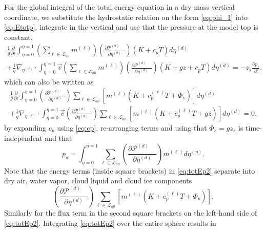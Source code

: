 \documentclass{agujournal}
\begin{document}
{For the global integral of the total energy equation in a dry-mass vertical coordinate, we substitute the hydrostatic relation on the form \eqref{eq:phi_1} into \eqref{eq:Etotp}, integrate in the vertical and use that the pressure at the model top is constant,
\begin{multline}
\frac{1}{g}\frac{\partial }{\partial t}\int_{\eta=0}^{\eta=1} \left( \sum_{\ell \in \mathcal{L}_{all}} m^{(\ell)}\right) \left( \frac{\partial \mathcal{P}^{(d)}\quad }{\partial \eta^{(d)}} \right)\left(K+c_pT\right)d \eta^{(d)}\\ +\frac{1}{g}\nabla_{\eta^{(d)}} \cdot \int_{\eta=0}^{\eta=1} \vec{v} \left( \sum_{\ell \in \mathcal{L}_{all}} m^{(\ell)}\right) \left( \frac{\partial \mathcal{P}^{(d)}\quad }{\partial \eta^{(d)}} \right)\left( K+gz+c_pT \right) d \eta^{(d)} =-z_s\frac{\partial p_s}{\partial t},\label{eq:tmp99}
\end{multline}
which can also be written as
\begin{multline}
\frac{1}{g}\frac{\partial }{\partial t}\int_{\eta=0}^{\eta=1} \left( \frac{\partial \mathcal{P}^{(d)}\quad }{\partial \eta^{(d)}} \right)\sum_{\ell \in \mathcal{L}_{all}} \left[m^{(\ell)} \left(K+c_p^{(\ell)}T+\Phi_s  \right)\right]d \eta^{(d)}\\ +\frac{1}{g}\nabla_{\eta^{(d)}} \cdot \int_{\eta=0}^{\eta=1} \vec{v} \left( \frac{\partial \mathcal{P}^{(d)}\quad }{\partial \eta^{(d)}} \right)\sum_{\ell \in \mathcal{L}_{all}} \left[ m^{(\ell)}\left(K+c_p^{(\ell)}T+gz\right) \right]d \eta^{(d)} =0.\label{eq:totEp2}
\end{multline}
by expanding $c_p$ using \eqref{eq:cp}, re-arranging terms and using that $\Phi_s=gz_s$ is time-independent and that 
\begin{equation}
p_s=\int_{\eta=0}^{\eta=1}\sum_{\ell \in \mathcal{L}_{all}}  \left( \frac{\partial \mathcal{P}^{(d)}\quad }{\partial \eta^{(d)}}\right) m^{(\ell)}d\eta^{(\eta)}.
\end{equation}
Note that the energy terms (inside square brackets) in \eqref{eq:totEp2} separate into dry air, water vapor, cloud liquid and cloud ice components
\begin{equation}
\left( \frac{\partial \mathcal{P}^{(d)}\quad }{\partial \eta^{(d)}} \right)\sum_{\ell \in \mathcal{L}_{all}} \left[ m^{(\ell)}\left(K+c_p^{(\ell)}T+\Phi_s\right)\right].
\end{equation}
Similarly for the flux term in the second square brackets on the left-hand side of \eqref{eq:totEp2}. Integrating \eqref{eq:totEp2} over the entire sphere results in
}
\end{document}
